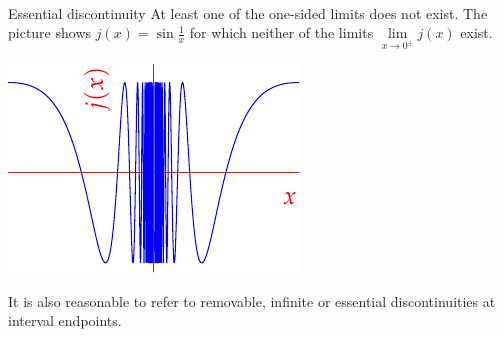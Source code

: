 \begin{description}
\begin{minipage}[t]{0.34\linewidth}
	\end{minipage}\\[5pt]
	\begin{minipage}[t]{0.65\linewidth}\vspace{0pt}
	\item[Essential discontinuity] At least one of the one-sided limits does not exist. The picture shows $j(x)=\sin\frac 1x$ for which neither of the limits $\lim\limits_{x\to 0^\pm}j(x)$ exist.
	\end{minipage}
	\begin{minipage}[t]{0.34\linewidth}\vspace{0pt}
	\flushright\includegraphics{discont5}
	\end{minipage}
\end{description}
It is also reasonable to refer to removable, infinite or essential discontinuities at interval endpoints.\clearpage


